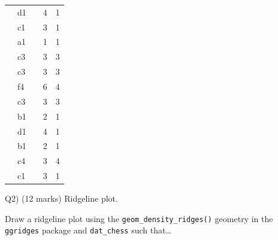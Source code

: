 \documentclass[
]{article}
\begin{document}
\begin{table}[!t]
\begin{tabular*}{\linewidth}{@{\extracolsep{\fill}}llrrr}
{\cellcolor[HTML]{FF00FF}{\textcolor[HTML]{FFFFFF}{R}}} & {d1} & {\cellcolor[HTML]{4FBDFF}{\textcolor[HTML]{000000}{661}}} & {4} & {1} \\ 
{\cellcolor[HTML]{FF0000}{\textcolor[HTML]{FFFFFF}{B}}} & {c1} & {\cellcolor[HTML]{4CBFFF}{\textcolor[HTML]{000000}{639}}} & {3} & {1} \\ 
{\cellcolor[HTML]{FF00FF}{\textcolor[HTML]{FFFFFF}{R}}} & {a1} & {\cellcolor[HTML]{4AC0FF}{\textcolor[HTML]{000000}{626}}} & {1} & {1} \\ 
{\cellcolor[HTML]{00FF00}{\textcolor[HTML]{000000}{N}}} & {c3} & {\cellcolor[HTML]{44C2FF}{\textcolor[HTML]{000000}{594}}} & {3} & {3} \\ 
{\cellcolor[HTML]{00FF00}{\textcolor[HTML]{000000}{N}}} & {c3} & {\cellcolor[HTML]{3DC5FF}{\textcolor[HTML]{000000}{556}}} & {3} & {3} \\ 
{\cellcolor[HTML]{FF0000}{\textcolor[HTML]{FFFFFF}{B}}} & {f4} & {\cellcolor[HTML]{3AC6FF}{\textcolor[HTML]{000000}{544}}} & {6} & {4} \\ 
{\cellcolor[HTML]{00FF00}{\textcolor[HTML]{000000}{N}}} & {c3} & {\cellcolor[HTML]{36C7FF}{\textcolor[HTML]{000000}{527}}} & {3} & {3} \\ 
{\cellcolor[HTML]{00FF00}{\textcolor[HTML]{000000}{N}}} & {b1} & {\cellcolor[HTML]{35C8FF}{\textcolor[HTML]{000000}{520}}} & {2} & {1} \\ 
{\cellcolor[HTML]{FF00FF}{\textcolor[HTML]{FFFFFF}{R}}} & {d1} & {\cellcolor[HTML]{2CCAFF}{\textcolor[HTML]{000000}{488}}} & {4} & {1} \\ 
{\cellcolor[HTML]{00FF00}{\textcolor[HTML]{000000}{N}}} & {b1} & {\cellcolor[HTML]{2ACAFF}{\textcolor[HTML]{000000}{483}}} & {2} & {1} \\ 
{\cellcolor[HTML]{FF0000}{\textcolor[HTML]{FFFFFF}{B}}} & {c4} & {\cellcolor[HTML]{22CCFF}{\textcolor[HTML]{000000}{462}}} & {3} & {4} \\ 
{\cellcolor[HTML]{FF0000}{\textcolor[HTML]{FFFFFF}{B}}} & {c1} & {\cellcolor[HTML]{22CCFF}{\textcolor[HTML]{000000}{461}}} & {3} & {1} \\ 
\bottomrule
\end{tabular*}
\end{table}

\newpage

Q2) (12 marks) Ridgeline plot.

Draw a ridgeline plot using the \texttt{geom\_density\_ridges()}
geometry in the \texttt{ggridges} package and \texttt{dat\_chess} such
that\ldots{}
\end{document}
